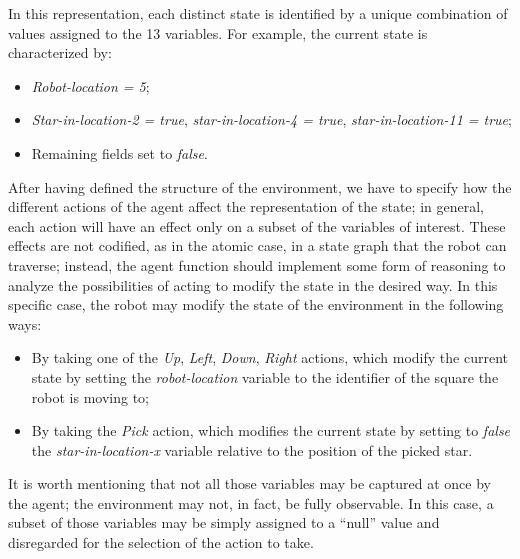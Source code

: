 \documentclass[letterpaper,headings=standardclasses]{scrartcl}
\begin{document}
In this representation, each distinct state is identified by a unique combination of values assigned to the 13 variables. For example, the current state is characterized by:

\begin{itemize}

\item \emph{Robot-location = 5};
\item \emph{Star-in-location-2 = true}, \emph{star-in-location-4 = true}, \emph{star-in-location-11 = true};
\item Remaining fields set to \emph{false}.

\end{itemize}

After having defined the structure of the environment, we have to specify how the different actions of the agent affect the representation of the state; in general, each action will have an effect only on a subset of the variables of interest. These effects are not codified, as in the atomic case, in a state graph that the robot can traverse; instead, the agent function should implement some form of reasoning to analyze the possibilities of acting to modify the state in the desired way. In this specific case, the robot may modify the state of the environment in the following ways:

\begin{itemize}

\item By taking one of the \emph{Up}, \emph{Left}, \emph{Down}, \emph{Right} actions, which modify the current state by setting the \emph{robot-location} variable to the identifier of the square the robot is moving to;

\item By taking the \emph{Pick} action, which modifies the current state by setting to \emph{false} the \emph{star-in-location-x} variable relative to the position of the picked star.

\end{itemize}

It is worth mentioning that not all those variables may be captured at once by the agent; the environment may not, in fact, be fully observable. In this case, a subset of those variables may be simply assigned to a “null” value and disregarded for the selection of the action to take.
\end{document}
